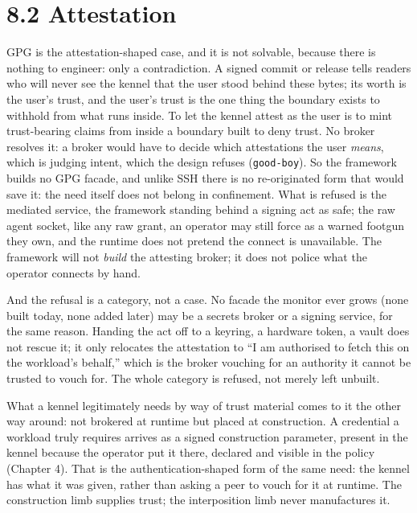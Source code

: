 \hypertarget{attestation}{%
\section{8.2 Attestation}\label{attestation}}

GPG is the attestation-shaped case, and it is not solvable, because
there is nothing to engineer: only a contradiction. A signed commit or
release tells readers who will never see the kennel that the user stood
behind these bytes; its worth is the user's trust, and the user's trust
is the one thing the boundary exists to withhold from what runs inside.
To let the kennel attest as the user is to mint trust-bearing claims
from inside a boundary built to deny trust. No broker resolves it: a
broker would have to decide which attestations the user \emph{means},
which is judging intent, which the design refuses (\texttt{good-boy}).
So the framework builds no GPG facade, and unlike SSH there is no
re-originated form that would save it: the need itself does not belong
in confinement. What is refused is the mediated service, the framework
standing behind a signing act as safe; the raw agent socket, like any
raw grant, an operator may still force as a warned footgun they own, and
the runtime does not pretend the connect is unavailable. The framework
will not \emph{build} the attesting broker; it does not police what the
operator connects by hand.

And the refusal is a category, not a case. No facade the monitor ever
grows (none built today, none added later) may be a secrets broker or a
signing service, for the same reason. Handing the act off to a keyring,
a hardware token, a vault does not rescue it; it only relocates the
attestation to ``I am authorised to fetch this on the workload's
behalf,'' which is the broker vouching for an authority it cannot be
trusted to vouch for. The whole category is refused, not merely left
unbuilt.

What a kennel legitimately needs by way of trust material comes to it
the other way around: not brokered at runtime but placed at
construction. A credential a workload truly requires arrives as a signed
construction parameter, present in the kennel because the operator put
it there, declared and visible in the policy (Chapter 4). That is the
authentication-shaped form of the same need: the kennel has what it was
given, rather than asking a peer to vouch for it at runtime. The
construction limb supplies trust; the interposition limb never
manufactures it.

